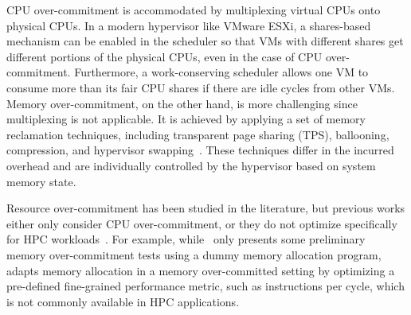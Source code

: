 CPU over-commitment is accommodated by multiplexing virtual 
CPUs onto physical CPUs. In a modern hypervisor like VMware ESXi, a shares-based mechanism can be enabled  
in the scheduler so that VMs with different shares get different portions of the physical CPUs, 
even in the case of CPU over-commitment. %
Furthermore, a work-conserving scheduler 
allows one VM to consume more than its fair CPU shares if there are idle cycles from other VMs. 
Memory over-commitment, on the other hand, is more challenging since multiplexing is not 
applicable. It is achieved by applying a set of memory reclamation techniques, including transparent page sharing (TPS), 
ballooning, compression, and hypervisor swapping~\cite{Waldspurger:2002:MRM:844128.844146,banerjee2013memory}. These techniques differ in the incurred 
overhead and are individually controlled by the hypervisor based on system memory state.  

Resource over-commitment has been studied in the literature, but previous works either only consider CPU over-commitment, or they do not optimize specifically for HPC workloads~\cite{tran2019,Tesfatsion2018,shao2011analyzing,gordon2011ginkgo,li2012evaluating}. For example, while~\cite{li2012evaluating} only presents some preliminary memory over-commitment tests using a dummy memory allocation program, \cite{gordon2011ginkgo} adapts memory allocation in a memory over-committed setting by optimizing a 
pre-defined fine-grained performance metric, such as instructions per cycle, which is not commonly available in HPC applications.



